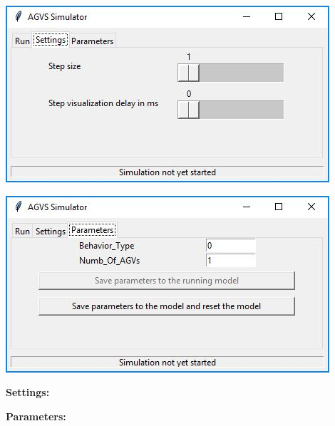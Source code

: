 \documentclass[12pt]{article}
\begin{document}
\newpage

\begin{minipage}[ht]{0.45\linewidth}
\centering
\includegraphics[width=\textwidth]{Figures/GUI/Console2.jpg}
\end{minipage}
\hspace{0.5cm}
\begin{minipage}[ht]{0.45\linewidth}
\centering
\includegraphics[width=\textwidth]{Figures/GUI/Console3.jpg}
\end{minipage}

\begin{minipage}[ht]{0.45\linewidth}
\vspace{0.2cm}
\textbf{Settings:} 

\end{minipage}
\hspace{0.5cm}
\begin{minipage}[ht]{0.45\linewidth}
\vspace{0.2cm}
\textbf{Parameters:} 

\end{minipage}
\end{document}
